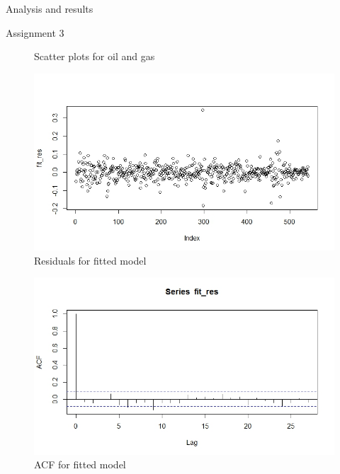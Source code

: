 \documentclass{article}
\begin{document}
\begin{section}{Analysis and results}
\begin{subsection}{Assignment 3}
\begin{figure}[ht!]
    \caption{Scatter plots for oil and gas}
    \label{fig:oilandgas_scatter}
\end{figure}
\begin{figure}[ht!]
    \centering
    \includegraphics[scale=0.4]{fitmodel_res}
    \caption{Residuals for fitted model}
    \label{fig:fitmodel_res}
\end{figure}
\begin{figure}[ht!]
    \centering
    \includegraphics[scale=0.4]{fitmodel_acf}
    \caption{ACF for fitted model}
    \label{fig:fitmodel_acf}
\end{figure}
\end{subsection}


\end{section}
\pagebreak
\end{document}
